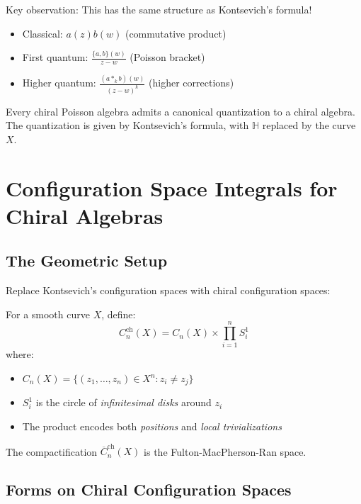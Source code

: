 Key observation: This has the same structure as Kontsevich's formula!
\begin{itemize}
\item Classical: $a(z)b(w)$ (commutative product)
\item First quantum: $\frac{\{a, b\}(w)}{z-w}$ (Poisson bracket)
\item Higher quantum: $\frac{(a *_k b)(w)}{(z-w)^k}$ (higher corrections)
\end{itemize}

\begin{theorem}
Every chiral Poisson algebra admits a canonical quantization to a chiral algebra. The quantization is given by Kontsevich's formula, with $\mathbb{H}$ replaced by the curve $X$.
\end{theorem}

\section{Configuration Space Integrals for Chiral Algebras}

\subsection{The Geometric Setup}

Replace Kontsevich's configuration spaces with chiral configuration spaces:

\begin{definition}
For a smooth curve $X$, define:
$$C_n^{\text{ch}}(X) = C_n(X) \times \prod_{i=1}^n S^1_i$$
where:
\begin{itemize}
\item $C_n(X) = \{(z_1, \ldots, z_n) \in X^n : z_i \neq z_j\}$
\item $S^1_i$ is the circle of \emph{infinitesimal disks} around $z_i$
\item The product encodes both \emph{positions} and \emph{local trivializations}
\end{itemize}

The compactification $\overline{C}_n^{\text{ch}}(X)$ is the Fulton-MacPherson-Ran space.
\end{definition}

\subsection{Forms on Chiral Configuration Spaces}

